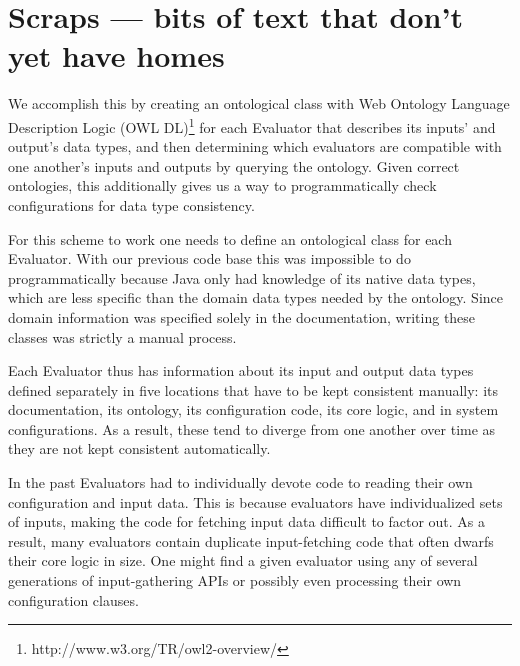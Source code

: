 \documentclass{article}
\begin{document}
\section{Scraps --- bits of text that don't yet have homes} %

We accomplish this by creating an ontological class with Web Ontology Language Description Logic (OWL DL)\footnote{http://www.w3.org/TR/owl2-overview/} for each Evaluator that describes its inputs' and output's data types, and then determining which evaluators are compatible with one another's inputs and outputs by querying the ontology.  Given correct ontologies, this additionally gives us a way to programmatically check configurations for data type consistency.

For this scheme to work one needs to define an ontological class for each Evaluator.  With our previous code base this was impossible to do programmatically because Java only had knowledge of its native data types, which are less specific than the domain data types needed by the ontology.  Since domain information was specified solely in the documentation, writing these classes was strictly a manual process.

Each Evaluator thus has information about its input and output data types defined separately in five locations that have to be kept consistent manually:  its documentation, its ontology, its configuration code, its core logic, and in system configurations.  As a result, these tend to diverge from one another over time as they are not kept consistent automatically.

In the past Evaluators had to individually devote code to reading their own configuration and input data.  This is because evaluators have individualized sets of inputs, making the code for fetching input data difficult to factor out.  As a result, many evaluators contain duplicate input-fetching code that often dwarfs their core logic in size.  One might find a given evaluator using any of several generations of input-gathering APIs or possibly even processing their own configuration clauses.
\end{document}
